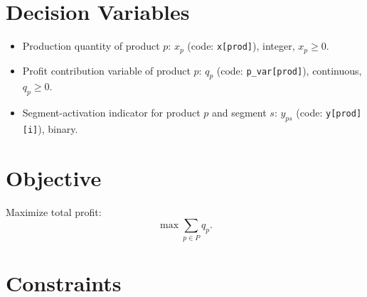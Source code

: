 \section*{Decision Variables}

\begin{itemize}
    \item Production quantity of product \(p\): \(x_p\) (code: \texttt{x[prod]}), integer, \(x_p\ge 0\).
    \item Profit contribution variable of product \(p\): \(q_p\) (code: \texttt{p\_var[prod]}), continuous, \(q_p\ge 0\).
    \item Segment-activation indicator for product \(p\) and segment \(s\): \(y_{ps}\) (code: \texttt{y[prod][i]}), binary.
\end{itemize}

\section*{Objective}

Maximize total profit:
\[
\max \sum_{p\in P} q_p.
\]

\section*{Constraints}

